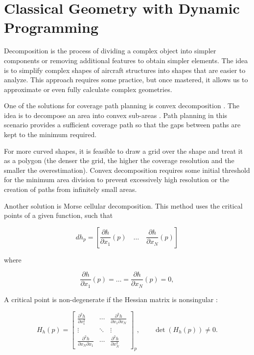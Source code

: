 \documentclass[11pt,a4paper,oneside,onecolumn]{article}
\begin{document}
\section{Classical Geometry with Dynamic Programming}

Decomposition is the process of dividing a complex object into simpler components or removing additional features to obtain simpler elements. The idea is to simplify complex shapes of aircraft structures into shapes that are easier to analyze. This approach requires some practice, but once mastered, it allows us to approximate or even fully calculate complex geometries.

One of the solutions for coverage path planning is convex decomposition \cite{mdpi2019convex}. The idea is to decompose an area into convex sub-areas \cite{mdpi2019convex}. Path planning in this scenario provides a sufficient coverage path so that the gaps between paths are kept to the minimum required.

For more curved shapes, it is feasible to draw a grid over the shape and treat it as a polygon (the denser the grid, the higher the coverage resolution and the smaller the overestimation). Convex decomposition requires some initial threshold for the minimum area division to prevent excessively high resolution or the creation of paths from infinitely small areas.

Another solution is Morse cellular decomposition. This method uses the critical points of a given function, such that

\[ dh_p = \left[ \frac{\partial h}{\partial x_1}(p) \quad \ldots \quad \frac{\partial h}{\partial x_N}(p) \right] \]

where

\[ \frac{\partial h}{\partial x_1}(p) = \ldots = \frac{\partial h}{\partial x_N}(p)= 0,\]

A critical point is non-degenerate if the Hessian matrix is nonsingular \cite{carriege2002morse}: 

\begin{equation}
H_h(p) =
\begin{bmatrix}
\frac{\partial^2 h}{\partial x_1^2}
& \cdots &
\frac{\partial^2 h}{\partial x_1 \partial x_N} \\
\vdots & \ddots & \vdots \\
\frac{\partial^2 h}{\partial x_N \partial x_1}
& \cdots &
\frac{\partial^2 h}{\partial x_N^2}
\end{bmatrix}_{p},
\qquad
\det(H_h(p)) \neq 0.
\end{equation}
\end{document}
